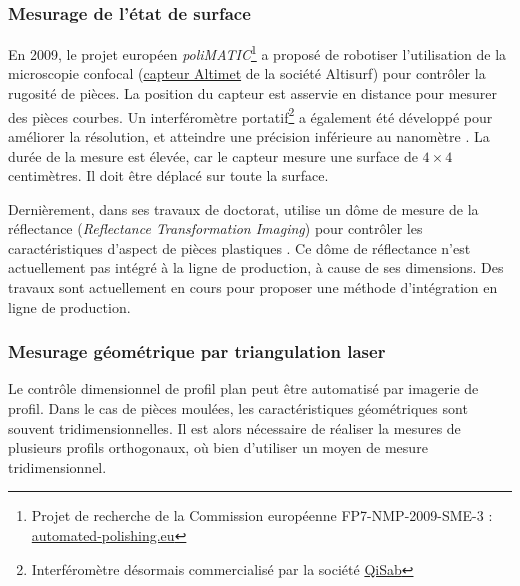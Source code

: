 \subsubsection{Mesurage de l'état de surface}
En 2009, le projet européen \textit{poliMATIC}\footnote{Projet de recherche de la Commission européenne FP7-NMP-2009-SME-3 : \href{https://www.automated-polishing.eu/}{automated-polishing.eu}} a proposé de robotiser l'utilisation de la microscopie confocal (\href{https://www.altimet.fr/?page_id=248}{capteur Altimet} de la société Altisurf) pour contrôler la rugosité de pièces.
La position du capteur est asservie en distance pour mesurer des pièces courbes.
Un interféromètre portatif\footnote{Interféromètre désormais commercialisé par la société \href{http://qisab.com/}{QiSab}} a également été développé pour améliorer la résolution, et atteindre une précision inférieure au nanomètre \cite{baath_new_2012}.
La durée de la mesure est élevée, car le capteur mesure une surface de $4\times 4$ centimètres.
Il doit être déplacé sur toute la surface.

Dernièrement, dans ses travaux de doctorat, \citeauthor{lacombe_exploitation_2018a} utilise un dôme de mesure de la réflectance (\textit{Reflectance Transformation Imaging}) pour contrôler les caractéristiques d'aspect de pièces plastiques \cite{lacombe_exploitation_2018a}.
Ce dôme de réflectance n'est actuellement pas intégré à la ligne de production, à cause de ses dimensions.
Des travaux sont actuellement en cours pour proposer une méthode d'intégration en ligne de production.

\subsubsection{Mesurage géométrique par triangulation laser} \label{subsec:scan3D}
Le contrôle dimensionnel de profil plan peut être automatisé par imagerie de profil.
Dans le cas de pièces moulées, les caractéristiques géométriques sont souvent tridimensionnelles.
Il est alors nécessaire de réaliser la mesures de plusieurs profils orthogonaux, où bien d'utiliser un moyen de mesure tridimensionnel.

